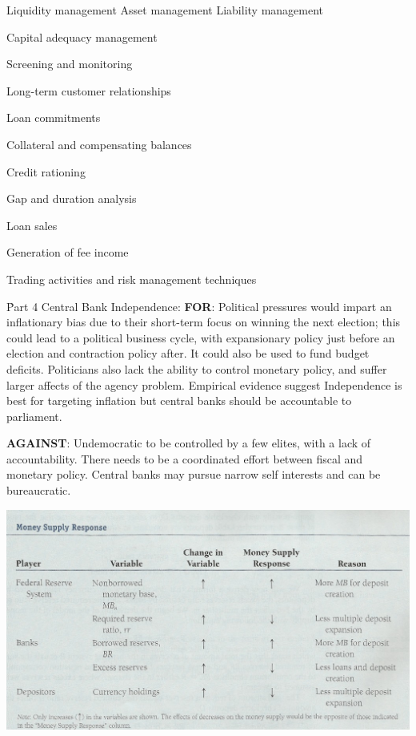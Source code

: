 \documentclass[12pt]{examnotes}
\begin{document}
Liquidity management
\ra 
Asset management
\ra 
Liability management
\ra 

Capital adequacy management
\ra 




Screening and monitoring
\ra 

Long-term customer relationships
\ra 

Loan commitments
\ra 

Collateral and compensating balances
\ra 

Credit rationing
\ra 

Gap and duration analysis
\ra 

\ra 

Loan sales
\ra 

Generation of fee income
\ra 

Trading activities and risk management techniques
\ra 


\h{Part 4}
Central Bank Independence:
\textbf{FOR}: Political pressures would impart an inflationary bias due to their short-term focus on winning the next election; this could lead to a political business cycle, with expansionary policy just before an election and contraction policy after. It could also be used to fund budget deficits. Politicians also lack the ability to control monetary policy, and suffer larger affects of the agency problem. Empirical evidence suggest Independence is best for targeting inflation but central banks should be accountable to parliament.

\textbf{AGAINST}: 
Undemocratic to be controlled by a few elites, with a lack of accountability. There needs to be a coordinated effort between fiscal and monetary policy. Central banks may pursue narrow self interests and can be bureaucratic. 

\begin{center}
  \includegraphics[scale=0.5]{./imgs/moneysupplytable.jpg}
\end{center}
\end{document}
